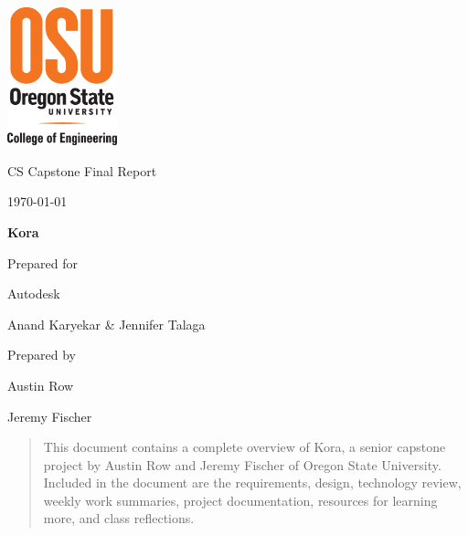 \documentclass[onecolumn, draftclsnofoot,10pt, compsoc]{IEEEtran}
\def \CapstoneTeamName{\textbf{Insert Team Name Here} }
\def \botname{Kora\xspace}
\def \GroupMemberOne{Austin Row}
\def \GroupMemberTwo{Jeremy Fischer}
\def \CapstoneProjectName{\botname}
\def \CapstoneSponsorCompany{Autodesk}
\def \CapstoneSponsorPerson{Anand Karyekar \& Jennifer Talaga}
\def \DocType{ Final Report}
\newcommand{\NameSigPair}[1]{\par
\makebox[2.75in][r]{#1} \hfil 	\makebox[3.25in]{\makebox[2.25in]{\hrulefill} \hfill		\makebox[.75in]{\hrulefill}}
\par\vspace{-12pt} \textit{\tiny\noindent
\makebox[2.75in]{} \hfil		\makebox[3.25in]{\makebox[2.25in][r]{Signature} \hfill	\makebox[.75in][r]{Date}}}}
\renewcommand{\NameSigPair}[1]{#1}
\begin{document}
\begin{titlepage}
    \begin{singlespace}
    	\includegraphics[height=4cm]{coe_v_spot1}
        \par\vspace{.2in}
        \centering
        \scshape{
            \huge CS Capstone \DocType \par
            {\large\today}\par
            \vspace{.5in}
            \textbf{\Huge\CapstoneProjectName}\par
            \vfill
            {\large Prepared for}\par
            \Huge \CapstoneSponsorCompany\par
            \vspace{5pt}
            {\Large\NameSigPair{\CapstoneSponsorPerson}\par}
            {\large Prepared by }\par
            \vspace{5pt}
            {\Large
                \NameSigPair{\GroupMemberOne}\par
                \NameSigPair{\GroupMemberTwo}\par
            }
            \vspace{20pt}
        }
        \begin{abstract}
			This document contains a complete overview of Kora, a senior capstone project by Austin Row and Jeremy Fischer of Oregon State University.
			Included in the document are the requirements, design, technology review, weekly work summaries, project documentation, resources for learning more, and class reflections.
        \end{abstract}
    \end{singlespace}
\end{titlepage}
\newpage
{}
\tableofcontents
\clearpage
\end{document}
